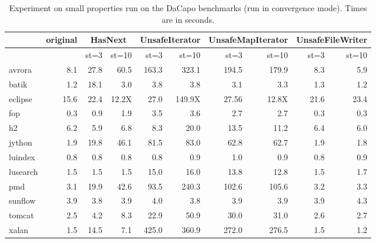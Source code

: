 \documentclass[9pt, preprint]{sigplanconf} %
\theoremstyle{definition}
\theoremstyle{remark}
\begin{document}
\begin{table}[t]\tiny
\begin{center}
\begin{tabular}{|l|r||r|r||r|r||r|r||r|r|} \hline
  & original  & \multicolumn{2}{|c||}{HasNext} & \multicolumn{2}{c||}{UnsafeIterator} &\multicolumn{2}{|c||}{UnsafeMapIterator} & \multicolumn{2}{|c|}{UnsafeFileWriter}
  \\ \hline
  & & st=3 & st=10 & st=3 & st=10 & st=3 & st=10 & st=3 & st=10 
  \\ \hline \hline
 avrora  & 8.1 & 27.8 & 60.5 & 163.3 & 323.1 & 194.5  & 179.9 & 8.3 & 5.9 
 \\ \hline
 batik     &  1.2  & 18.1 &    3.0 & 3.8 &  3.8  & 3.1 &  3.3 & 1.3  &  1.2 
 \\ \hline
eclipse   &  15.6  &  22.4 &  12.2X & 27.0 &  149.9X & 27.56 &  12.8X & 21.6 &  23.4 
\\ \hline
fop    &   0.3   &  0.9 &  1.9 & 3.5  &  3.6   & 2.7 &   2.7 & 0.3 &   0.3
\\ \hline
h2     &    6.2  &  5.9 &  6.8   & 8.3    & 20.0  & 13.5 & 11.2   & 6.4 & 6.0  
\\ \hline
jython    &  1.9  & 19.8 &  46.1 &  81.5   & 83.0  &  62.8 &       62.7    & 1.9 & 1.8 
\\ \hline
luindex     &  0.8   & 0.8 &   0.8    & 0.8 & 0.9  & 1.0  &   0.9 & 0.8 & 0.9 
\\ \hline
lusearch    &  1.5  &  1.5 &   1.5 & 15.0 &  16.0    & 13.8  &  12.8    & 1.5 & 1.7 
\\ \hline
pmd        &   3.1    & 19.9 & 42.6  &  93.5 & 240.3   & 102.6 &       105.6  & 3.2 &           3.3 
\\ \hline
sunflow    &  3.9   & 3.8 &  3.9  &  4.0 & 3.8    & 3.9 &        3.9     & 3.9 &         4.3 
\\ \hline
tomcat     &   2.5    & 4.2 & 8.3   & 22.9 & 50.9   & 30.0 &        31.0   & 2.6 &          2.7 
\\ \hline
xalan      &    1.5   &  14.5      & 7.1 & 425.0  & 360.9 &  272.0   & 276.5 &  1.5 & 1.2 
\\ \hline  
\end{tabular}
\end{center}
\caption{Experiment on small properties run on the DaCapo benchmarks
  (run in convergence mode). Times are in seconds.}
\label{table:experiments}%
\end{table}%
\end{document}
